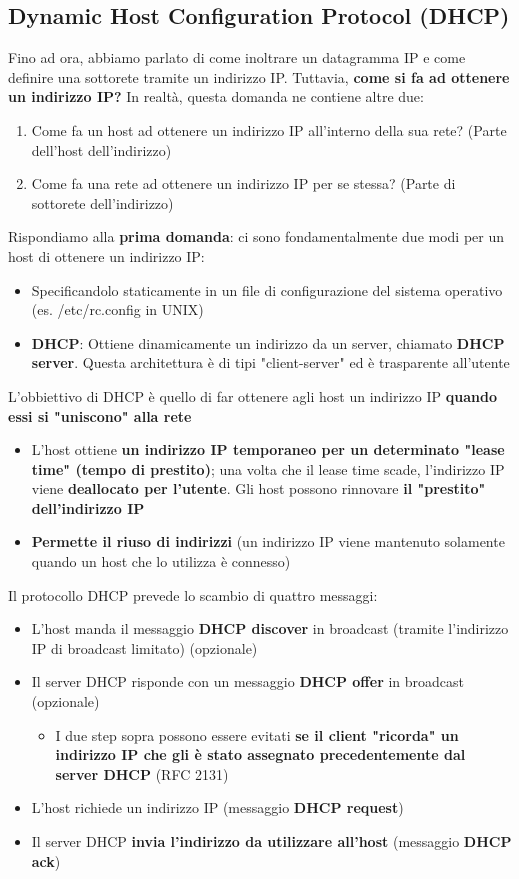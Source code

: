 \documentclass[12pt]{article}
\begin{document}
\subsection{Dynamic Host Configuration Protocol (DHCP)}
Fino ad ora, abbiamo parlato di come inoltrare un datagramma IP e come definire una sottorete tramite un indirizzo IP.
Tuttavia, \textbf{come si fa ad ottenere un indirizzo IP?} In realtà, questa domanda ne contiene altre due:
\begin{enumerate}
    \item Come fa un host ad ottenere un indirizzo IP all'interno della sua rete? (Parte dell'host dell'indirizzo)
    \item Come fa una rete ad ottenere un indirizzo IP per se stessa? (Parte di sottorete dell'indirizzo)
\end{enumerate}
Rispondiamo alla \textbf{prima domanda}: ci sono fondamentalmente due modi per un host di ottenere un indirizzo IP:
\begin{itemize}
    \item Specificandolo staticamente in un file di configurazione del sistema operativo (es. /etc/rc.config in UNIX)
    \item \textbf{DHCP}: Ottiene dinamicamente un indirizzo da un server, chiamato \textbf{DHCP server}. Questa architettura è di tipi "client-server" ed è trasparente all'utente
\end{itemize}
L'obbiettivo di DHCP è quello di far ottenere agli host un indirizzo IP \textbf{quando essi si "uniscono" alla rete}
\begin{itemize}
    \item L'host ottiene \textbf{un indirizzo IP temporaneo per un determinato "lease time" (tempo di prestito)}; una volta che il lease time scade, l'indirizzo IP viene \textbf{deallocato per l'utente}.
    Gli host possono rinnovare \textbf{il "prestito" dell'indirizzo IP}
    \item \textbf{Permette il riuso di indirizzi} (un indirizzo IP viene mantenuto solamente quando un host che lo utilizza è connesso)
\end{itemize}
Il protocollo DHCP prevede lo scambio di quattro messaggi:
\begin{itemize}
    \item L'host manda il messaggio \textbf{DHCP discover} in broadcast (tramite l'indirizzo IP di broadcast limitato) (opzionale)
    \item Il server DHCP risponde con un messaggio \textbf{DHCP offer} in broadcast (opzionale)
    \begin{itemize}
        \item I due step sopra possono essere evitati \textbf{se il client "ricorda" un indirizzo IP che gli è stato assegnato precedentemente dal server DHCP} (RFC 2131)
    \end{itemize}
    \item L'host richiede un indirizzo IP (messaggio \textbf{DHCP request})
    \item Il server DHCP \textbf{invia l'indirizzo da utilizzare all'host} (messaggio \textbf{DHCP ack})
\end{itemize} 
\end{document}
